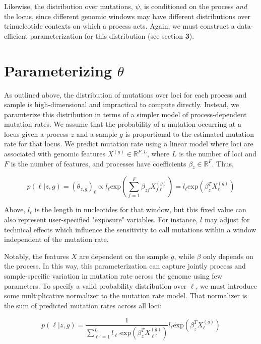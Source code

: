 \documentclass{article}
\begin{document}
Likewise, the distribution over mutations, $\psi$, is conditioned on the process \emph{and} the locus, since different genomic windows may have different 
distributions over trinucleotide contexts on which a process acts. Again, we must construct a data-efficient parameterization for this distribution (see section \textbf{3}).


\section{Parameterizing $\theta$}

As outlined above, the distribution of mutations over loci for each process and sample is high-dimensional and impractical to compute directly. Instead, we paramterize this
distribution in terms of a simpler model of process-dependent mutation rates. We assume that the probability of a mutation occurring at a locus given a process $z$ and a sample $g$ is proportional to the estimated mutation rate for that locus. We predict mutation rate using a linear model where loci are associated with genomic features $X^{(g)} \in \mathbb{R}^{F,L}$, where $L$ is the number of loci and $F$ is the number of features, and processes have coefficients $\beta_z \in \mathbb{R}^{F}$. Thus, 

\begin{equation} \label{3}
p(\ell | z, g) = (\theta_{z,g})_\ell \propto l_\ell  \textrm{exp}(\sum_{f=1}^{F}\beta_{zf} X^{(g)}_{f\ell}) = l_\ell \textrm{exp}(\beta_z^T X^{(g)}_\ell)
\end{equation}

Above, $l_\ell$ is the length in nucleotides for that window, but this fixed value can also represent user-specified "exposure" variables. For instance, $l$ may adjust for technical effects which influence the sensitivity to call mutations within a window independent of the mutation rate.

Notably, the features $X$ are dependent on the sample $g$, while $\beta$ only depends on the process. In this way, this parameterization can capture jointly process and sample-specific variation in mutation rate across the genome using few parameters. To specify a valid probability distribution over $\ell$, we must introduce some multiplicative normalizer to the mutation rate model. That normalizer is the sum of predicted mutation rates across all loci:

\begin{equation}
p(\ell | z, g) = \frac{1}{\sum_{\ell'=1}^L l_{\ell'} \textrm{exp}(\beta_z^T X^{(g)}_{\ell'})} l_\ell \textrm{exp}(\beta_z^T X^{(g)}_\ell)
\end{equation}
\end{document}
